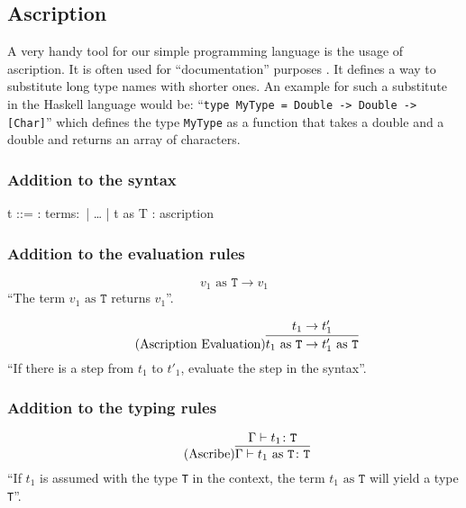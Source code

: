 \subsection{Ascription}

A very handy tool for our simple programming language is the usage of ascription.
It is often used for ``documentation'' purposes \cite{pierce2002ProgLang}. It defines
a way to substitute long type names with shorter ones. An example for such a substitute
in the Haskell language would be: ``\texttt{type MyType = Double -> Double -> [Char]}''
which defines the type \texttt{MyType} as a function that takes a double and a double
and returns an array of characters.

\subsubsection{Addition to the syntax \cite{pierce2002ProgLang}}
\begin{bnfgrammar}
    t ::= : terms$\colon$
    | \dots
    | t as T : ascription
\end{bnfgrammar}\leavevmode\newline

\subsubsection{Addition to the evaluation rules \cite{pierce2002ProgLang}}
\begin{equation*}
    \tag{Ascribe Value}
    v_1 \text{ as } \texttt{T} \rightarrow v_1
\end{equation*}
``The term $v_1 \text{ as } \texttt{T}$ returns $v_1$''.

\begin{equation*}
    \tag{Ascription Evaluation}
    \infer{
        t_1 \text{ as } \texttt{T} \rightarrow t'_1 \text{ as } \texttt{T}
    }{
        t_1 \rightarrow t'_1
    }
\end{equation*}
``If there is a step from $t_1$ to $t'_1$, evaluate the step
in the syntax''.

\subsubsection{Addition to the typing rules \cite{pierce2002ProgLang}}
\begin{equation*}
    \tag{Ascribe}
    \infer{
        \Gamma \vdash t_1 \text{ as } \texttt{T} \colon \texttt{T}
    }{
        \Gamma \vdash t_1 \colon \texttt{T}
    }
\end{equation*}
``If $t_1$ is assumed with the type \texttt{T} in the context,
the term $t_1 \text{ as } \texttt{T}$ will yield a type \texttt{T}''.
